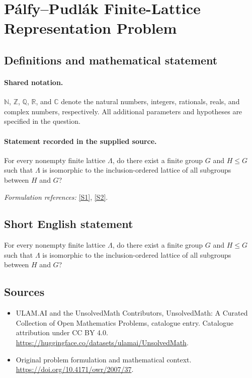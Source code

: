 \documentclass[11pt]{article}
\newcommand{\sref}[2]{\hyperlink{source:#1:#2}{[S#2]}}
\begin{document}
\section{Pálfy–Pudlák Finite-Lattice Representation Problem}\label{statement}

\subsection{Definitions and mathematical statement}

\paragraph{Shared notation.}$\mathbb N$, $\mathbb Z$, $\mathbb Q$, $\mathbb R$, and $\mathbb C$ denote the natural numbers, integers, rationals, reals, and complex numbers, respectively. All additional parameters and hypotheses are specified in the question.


\paragraph{Statement recorded in the supplied source.}
For every nonempty finite lattice $\Lambda$, do there exist a finite group $G$ and $H\leq G$ such that $\Lambda$ is isomorphic to the inclusion-ordered lattice of all subgroups between $H$ and $G$?
\par\smallskip\textit{Formulation references:} \sref{statement}{1}, \sref{statement}{2}.
\subsection{Short English statement}
For every nonempty finite lattice $\Lambda$, do there exist a finite group $G$ and $H\leq G$ such that $\Lambda$ is isomorphic to the inclusion-ordered lattice of all subgroups between $H$ and $G$?
\subsection{Sources}
\begin{itemize}
\item[\hypertarget{source:statement:1}{S1}] ULAM.AI and the UnsolvedMath Contributors, UnsolvedMath: A Curated Collection of Open Mathematics Problems, catalogue entry. Catalogue attribution under CC BY 4.0.
\url{https://huggingface.co/datasets/ulamai/UnsolvedMath}.
\item[\hypertarget{source:statement:2}{S2}] Original problem formulation and mathematical context.
\url{https://doi.org/10.4171/owr/2007/37}.
\end{itemize}
\label{end:statement}
\end{document}
